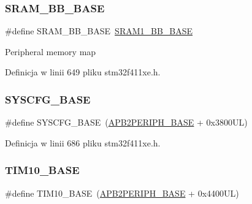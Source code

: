 \subsubsection{\texorpdfstring{S\+R\+A\+M\+\_\+\+B\+B\+\_\+\+B\+A\+SE}{SRAM\_BB\_BASE}}
{\footnotesize\ttfamily \#define S\+R\+A\+M\+\_\+\+B\+B\+\_\+\+B\+A\+SE~\hyperlink{group___peripheral__memory__map_gac4c4f61082e4b168f29d9cf97dc3ca5c}{S\+R\+A\+M1\+\_\+\+B\+B\+\_\+\+B\+A\+SE}}

Peripheral memory map 

Definicja w linii 649 pliku stm32f411xe.\+h.

\mbox{\label{group___peripheral__memory__map_ga62246020bf3b34b6a4d8d0e84ec79d3d}} 
\subsubsection{\texorpdfstring{S\+Y\+S\+C\+F\+G\+\_\+\+B\+A\+SE}{SYSCFG\_BASE}}
{\footnotesize\ttfamily \#define S\+Y\+S\+C\+F\+G\+\_\+\+B\+A\+SE~(\hyperlink{group___peripheral__memory__map_ga25b99d6065f1c8f751e78f43ade652cb}{A\+P\+B2\+P\+E\+R\+I\+P\+H\+\_\+\+B\+A\+SE} + 0x3800\+U\+L)}



Definicja w linii 686 pliku stm32f411xe.\+h.

\mbox{\label{group___peripheral__memory__map_ga3eff32f3801db31fb4b61d5618cad54a}} 
\subsubsection{\texorpdfstring{T\+I\+M10\+\_\+\+B\+A\+SE}{TIM10\_BASE}}
{\footnotesize\ttfamily \#define T\+I\+M10\+\_\+\+B\+A\+SE~(\hyperlink{group___peripheral__memory__map_ga25b99d6065f1c8f751e78f43ade652cb}{A\+P\+B2\+P\+E\+R\+I\+P\+H\+\_\+\+B\+A\+SE} + 0x4400\+U\+L)}



